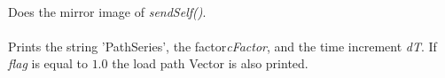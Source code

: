 \\
Does the mirror image of {\em sendSelf()}. \\

\\
Prints the string 'PathSeries', the factor{\em cFactor}, and the time
increment {\em dT}. If {\em flag} is equal to $1.0$ the load path
Vector is also printed.


